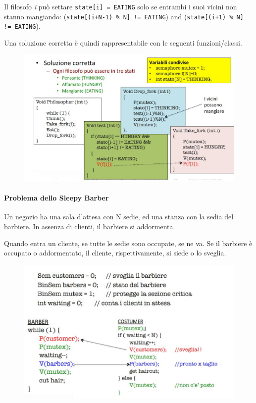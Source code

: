 \documentclass[a4paper]{article}
\begin{document}
Il filosofo \textit{i} può settare \texttt{state[i] = EATING} solo se entrambi i suoi vicini non stanno mangiando: (\texttt{state[(i+N-1) \% N] != EATING}) and (\texttt{state[(i+1) \% N] != EATING}).

Una soluzione corretta è quindi rappresentabile con le seguenti funzioni/classi.
\begin{figure}[h!]
    \includegraphics[width=\linewidth]{img/filosofi_ok.JPG}
\end{figure}

\paragraph{Problema dello Sleepy Barber}
Un negozio ha una sala d'attesa con N sedie, ed una stanza con la sedia del barbiere. In assenza di clienti, il barbiere si addormenta.

Quando entra un cliente, se tutte le sedie sono occupate, se ne va. Se il barbiere è occupato o addormentato, il cliente, rispettivamente, si siede o lo sveglia.
\begin{figure}[h!]
    \includegraphics[width=\linewidth]{img/barber.JPG}
\end{figure}
\end{document}
